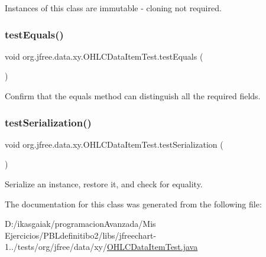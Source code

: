 Instances of this class are immutable -\/ cloning not required. \mbox{\label{classorg_1_1jfree_1_1data_1_1xy_1_1_o_h_l_c_data_item_test_af58d1258c85be018743608c0a220336b}} 
\subsubsection{\texorpdfstring{test\+Equals()}{testEquals()}}
{\footnotesize\ttfamily void org.\+jfree.\+data.\+xy.\+O\+H\+L\+C\+Data\+Item\+Test.\+test\+Equals (\begin{DoxyParamCaption}{ }\end{DoxyParamCaption})}

Confirm that the equals method can distinguish all the required fields. \mbox{\label{classorg_1_1jfree_1_1data_1_1xy_1_1_o_h_l_c_data_item_test_ac3c9dc1886be8527613a229e61f14721}} 
\subsubsection{\texorpdfstring{test\+Serialization()}{testSerialization()}}
{\footnotesize\ttfamily void org.\+jfree.\+data.\+xy.\+O\+H\+L\+C\+Data\+Item\+Test.\+test\+Serialization (\begin{DoxyParamCaption}{ }\end{DoxyParamCaption})}

Serialize an instance, restore it, and check for equality. 

The documentation for this class was generated from the following file\+:\begin{DoxyCompactItemize}
\item 
D\+:/ikasgaiak/programacion\+Avanzada/\+Mis Ejercicios/\+P\+B\+Ldefinitibo2/libs/jfreechart-\/1../tests/org/jfree/data/xy/\mbox{\hyperlink{_o_h_l_c_data_item_test_8java}{O\+H\+L\+C\+Data\+Item\+Test.\+java}}\end{DoxyCompactItemize}
